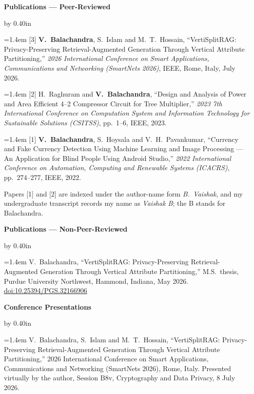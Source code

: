 \documentclass[10pt]{article}
\newcommand{\cvsection}[1]{%
  \vspace{8pt}%
  {\fontsize{11pt}{13pt}\selectfont\textbf{#1}}%
  \par\nobreak\vspace{4pt}%
}
\newenvironment{cvindent}{\par\advance\leftskip by 0.40in}{\par}
\newcommand{\cvbib}[1]{\par\noindent\hangindent=1.4em\hangafter=1 #1\par\vspace{4pt}}
\newcommand{\cvline}[1]{\par\noindent #1\par\vspace{4pt}}
\begin{document}
\cvsection{Publications --- Peer-Reviewed}
\begin{cvindent}
\cvbib{[3] \textbf{V.~Balachandra}, S.~Islam and M.~T.~Hossain, ``VertiSplitRAG: Privacy-Preserving
Retrieval-Augmented Generation Through Vertical Attribute Partitioning,'' \emph{2026 International
Conference on Smart Applications, Communications and Networking (SmartNets 2026)}, IEEE, Rome, Italy,
July 2026.}
\cvbib{[2] H.~Raghuram and \textbf{V.~Balachandra}, ``Design and Analysis of Power and Area Efficient
4--2 Compressor Circuit for Tree Multiplier,'' \emph{2023 7th International Conference on Computation
System and Information Technology for Sustainable Solutions (CSITSS)}, pp.~1--6, IEEE, 2023.}
\cvbib{[1] \textbf{V.~Balachandra}, S.~Hoysala and V.~H.~Pavankumar, ``Currency and Fake Currency
Detection Using Machine Learning and Image Processing --- An Application for Blind People Using Android
Studio,'' \emph{2022 International Conference on Automation, Computing and Renewable Systems (ICACRS)},
pp.~274--277, IEEE, 2022.}
\vspace{2pt}
\cvline{\fontsize{9pt}{11pt}\selectfont Papers [1] and [2] are indexed under the author-name form
\emph{B.~Vaishak}, and my undergraduate transcript records my name as \emph{Vaishak B}; the B stands
for Balachandra.}
\end{cvindent}

\cvsection{Publications --- Non-Peer-Reviewed}
\begin{cvindent}
\cvbib{V.~Balachandra, ``VertiSplitRAG: Privacy-Preserving Retrieval-Augmented Generation Through
Vertical Attribute Partitioning,'' M.S.\ thesis, Purdue University Northwest, Hammond, Indiana, May
2026. \href{https://doi.org/10.25394/PGS.32166906}{doi:10.25394/PGS.32166906}}
\end{cvindent}

\cvsection{Conference Presentations}
\begin{cvindent}
\cvbib{V.~Balachandra, S.~Islam and M.~T.~Hossain, ``VertiSplitRAG: Privacy-Preserving
Retrieval-Augmented Generation Through Vertical Attribute Partitioning,'' 2026 International Conference
on Smart Applications, Communications and Networking (SmartNets 2026), Rome, Italy. Presented virtually
by the author, Session B8v, Cryptography and Data Privacy, 8 July 2026.}

\end{cvindent}
\end{document}
